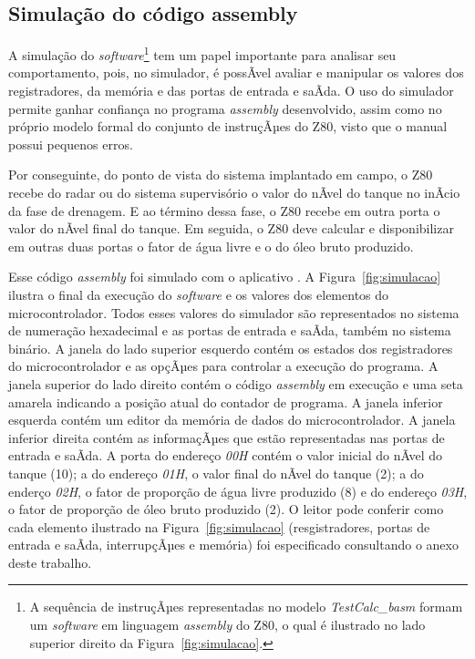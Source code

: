 \documentclass[11pt]{article} %
\begin{document}
\subsection{Simulação do código assembly}

A simulação do \textit{software}\footnote{A sequência de instruçÃµes representadas no modelo
\textit{TestCalc\_basm} formam um \textit{software} em linguagem \textit{assembly} do Z80, o qual é
ilustrado no lado superior direito da Figura~\ref{fig:simulacao}.} tem um papel importante para analisar
seu comportamento, pois, no simulador, é possÃ­vel avaliar e manipular os valores dos registradores, da
memória e das portas de entrada e saÃ­da. O uso do simulador permite ganhar confiança no programa \textit{assembly}
desenvolvido, assim como no próprio modelo formal do conjunto de instruçÃµes do Z80, visto que o manual
possui pequenos erros.

Por conseguinte, do ponto de vista do sistema implantado em campo, o Z80 recebe do radar ou do sistema
supervisório o valor do nÃ­vel do tanque no inÃ­cio da fase de drenagem. E ao término dessa fase, o Z80 recebe em outra porta o
valor do nÃ­vel final do tanque. Em seguida, o Z80 deve calcular e disponibilizar em outras duas portas o fator
de água livre e o do óleo bruto produzido.

Esse código \textit{assembly} foi simulado com o aplicativo \cite{Simulator_z80}. A
Figura~\ref{fig:simulacao} ilustra o final da execução do \textit{software} e os valores dos elementos do microcontrolador.
Todos esses valores do simulador são representados no sistema de numeração hexadecimal e as portas
de entrada e saÃ­da, também no sistema binário. A janela do lado superior esquerdo contém
os estados dos registradores do microcontrolador e as opçÃµes para controlar a execução do
programa. A janela superior do lado direito contém o código \textit{assembly} em execução e uma seta amarela
indicando a posição atual do contador de programa. A janela inferior esquerda contém um editor da
memória de dados do microcontrolador. A janela inferior direita contém as informaçÃµes que estão
representadas nas portas de entrada e saÃ­da. A porta do endereço \textit{00H} contém o valor inicial do
nÃ­vel do tanque (10); a do endereço \textit{01H}, o valor final do nÃ­vel do tanque (2); a do enderço
\textit{02H}, o fator de proporção de água livre produzido (8) e do endereço \textit{03H}, o fator de
proporção de óleo bruto produzido (2). O leitor pode conferir como cada elemento ilustrado na Figura~\ref{fig:simulacao}
(resgistradores, portas de entrada e saÃ­da, interrupçÃµes e memória) foi especificado consultando o anexo deste trabalho. 
\end{document}
